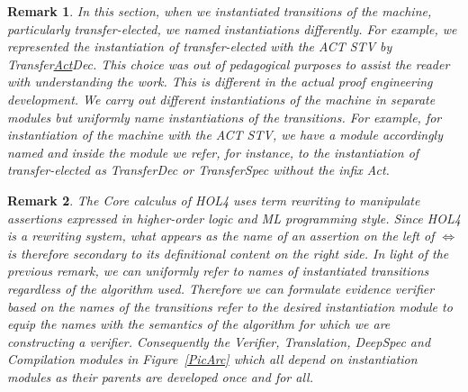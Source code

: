 \documentclass[10pt,conference]{IEEEtran}
\newtheorem{remark}{Remark}
\begin{document}
\begin{remark}\label{naming}
In this section, when we instantiated transitions of the machine,
particularly transfer-elected, we named instantiations differently.
For example, we represented the instantiation of transfer-elected with
the ACT STV by  Transfer\underline{Act}Dec. This choice was out of
pedagogical purposes to assist the reader with understanding the
work. This is different in the actual proof engineering development.  We carry out different instantiations of the machine in separate modules but uniformly name instantiations of the transitions. For example, for instantiation of the machine with the ACT STV, we have a module accordingly named and inside the module we refer, for instance, to the instantiation of transfer-elected as TransferDec or TransferSpec without the infix Act.
\end{remark}
\begin{remark}\label{rewrting}
The Core calculus of HOL4 uses \emph{term rewriting} to manipulate assertions expressed in higher-order logic and ML programming style.   
Since HOL4 is a rewriting system, what appears as the name of an
assertion on the left of $\Leftrightarrow$ is therefore secondary to
its definitional content on the right side. In light of the previous
remark, we can uniformly refer to \emph{names} of instantiated
transitions regardless of the algorithm used. Therefore we can
formulate evidence verifier based on the names of the transitions
refer to the desired instantiation  module to equip the names with
the semantics  of the algorithm for which we are constructing a
verifier. Consequently the Verifier, Translation, DeepSpec and Compilation modules in Figure~\ref{PicArc} which all depend on instantiation modules as their parents  are  developed once and for all.   
\end{remark}

 
\end{document}
